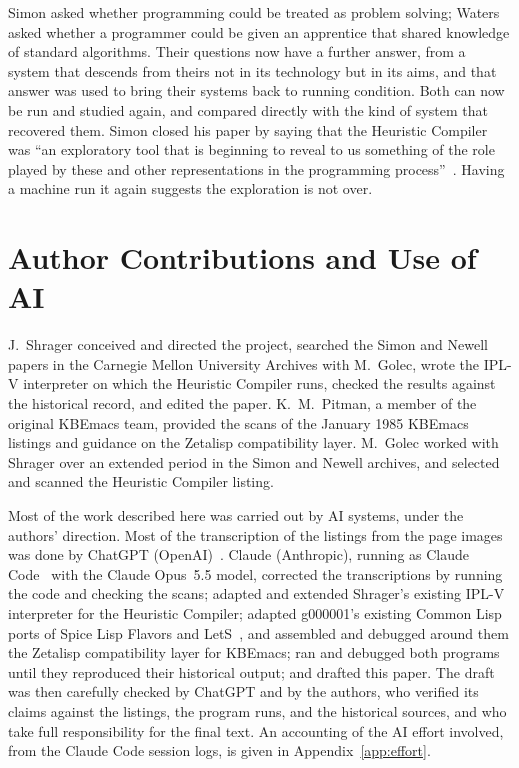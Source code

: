 \documentclass[11pt]{article}
\begin{document}
Simon asked whether programming could be treated as problem solving;
Waters asked whether a programmer could be given an apprentice that
shared knowledge of standard algorithms. Their questions now have a
further answer, from a system that descends from theirs not in its
technology but in its aims, and that answer was used to bring their
systems back to running condition. Both can now be run and studied
again, and compared directly with the kind of system that recovered
them. Simon closed his paper by saying that the Heuristic Compiler was
``an exploratory tool that is beginning to reveal to us something of the
role played by these and other representations in the programming
process''~\cite[p.~506]{simon1963jacm}. Having a machine run it
again suggests the exploration is not over.

\section*{Author Contributions and Use of AI}

J.~Shrager conceived and directed the project, searched the Simon and
Newell papers in the Carnegie Mellon University Archives with M.~Golec,
wrote the IPL-V interpreter on which the Heuristic Compiler runs,
checked the results against the historical record, and edited the
paper. K.~M.~Pitman, a member of the original KBEmacs team, provided
the scans of the January 1985 KBEmacs listings and guidance on the
Zetalisp compatibility layer. M.~Golec worked with Shrager over an
extended period in the Simon and Newell archives, and selected and
scanned the Heuristic Compiler listing.

Most of the work described here was carried out by AI systems, under
the authors' direction. Most of the transcription of the listings from
the page images was done by ChatGPT (OpenAI)~\cite{chatgpt}. Claude
(Anthropic), running as Claude Code~\cite{claude} with the Claude
Opus~5.5 model, corrected the transcriptions by running the code and
checking the scans; adapted and extended Shrager's existing IPL-V
interpreter for the Heuristic Compiler; adapted g000001's existing
Common Lisp ports of Spice Lisp Flavors and LetS~\cite{g000001}, and
assembled and debugged around them the Zetalisp compatibility layer
for KBEmacs; ran and debugged both programs until they reproduced
their historical output; and drafted this paper. The draft was then
carefully checked by ChatGPT and by the authors, who verified its
claims against the listings, the program runs, and the historical
sources, and who take full responsibility for the final text. An
accounting of the AI effort involved, from the Claude Code session
logs, is given in Appendix~\ref{app:effort}.
\end{document}

